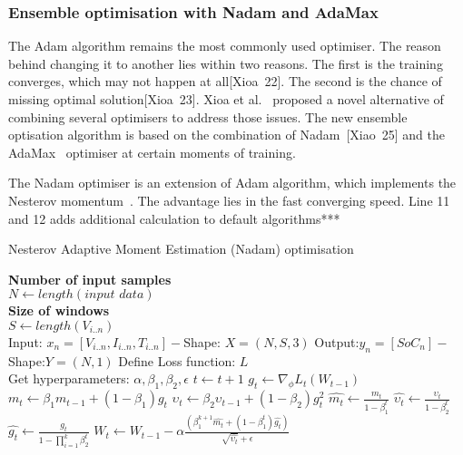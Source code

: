 \subsubsection{Ensemble optimisation with Nadam and AdaMax}
The Adam algorithm remains the most commonly used optimiser.
The reason behind changing it to another lies within two reasons.
The first is the training converges, which may not happen at all[Xioa~22].
The second is the chance of missing optimal solution[Xioa~23].
Xioa et al.~\cite{xiao_accurate_2019} proposed a novel alternative of combining several optimisers to address those issues.
The new ensemble optisation algorithm is based on the combination of Nadam~[Xiao~25] and the AdaMax~\cite{kingma_adam_2017} optimiser at certain moments of training.

%
%
The Nadam optimiser is an extension of Adam algorithm, which implements the Nesterov momentum~\cite{dozat_nadam_2016}.
The advantage lies in the fast converging speed.
Line 11 and 12 adds additional calculation to default algorithms*** \\
\begin{algorithm}
  \caption{Nesterov Adaptive Moment Estimation (Nadam) optimisation}
  \begin{algorithmic}[1]
    \STATE \textbf{Number of input samples} \\ $N\gets length(\textit{input data})$\\
    \STATE \textbf{Size of windows} \\ $S\gets length(V_{i..n})$\\
    \STATE Input: $x_n = [V_{i..n}, I_{i..n}, T_{i..n}] - $Shape: $X = (N, S, 3)$
    \STATE Output:$y_n = [SoC_{n}] - $Shape:$Y = (N, 1)$
    \STATE Define Loss function: $L$ \\
           Get hyperparameters: $\alpha, \beta_1, \beta_2, \epsilon$
    \STATE $t \gets t+1$
    \STATE $g_t \gets \nabla_\phi L_t (W_{t-1})$ 
    \STATE $m_t \gets \beta_1 m_{t-1}+(1-\beta_1) g_t $ 
    \STATE $\upsilon_t \gets \beta_2 \upsilon_{t-1}+ \left(1-\beta_2 \right)g^2_t $ 
    \STATE $\hat{m_t} \gets \frac{m_t}{1-\beta^t_1}$ 
    \STATE $\hat{\upsilon_t} \gets \frac{\upsilon_t}{1-\beta^t_2} $ 
    \STATE $\hat{g_t} \gets \frac{g_t}{1-\prod\nolimits_{i = 1}^{k}\beta^t_2} $ 
    \STATE $W_t \gets W_{t-1}-\alpha
                        \frac{\left(\beta^{k+1}_1\hat{m_t}+\left(1-\beta^t_1\right)\hat{g_t}\right)}
                             {\sqrt{\hat{\upsilon_t}}+\epsilon}$
    \ENDWHILE
  \end{algorithmic}
  \label{alg:nadam}
\end{algorithm}
